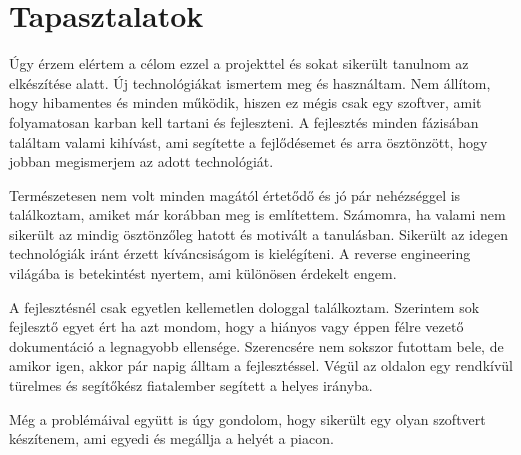 \documentclass{thesis-ekf}
\theoremstyle{definition}
\theoremstyle{remark}
\begin{document}
\chapter{Tapasztalatok}\label{tapasztalatok}

Úgy érzem elértem a célom ezzel a projekttel és sokat sikerült tanulnom az elkészítése alatt.
Új technológiákat ismertem meg és használtam. Nem állítom, hogy hibamentes és minden működik, hiszen ez mégis csak egy szoftver, amit folyamatosan karban kell tartani és fejleszteni.
A fejlesztés minden fázisában találtam valami kihívást, ami segítette a fejlődésemet és arra ösztönzött, hogy jobban megismerjem az adott technológiát.

Természetesen nem volt minden magától értetődő és jó pár nehézséggel is találkoztam, amiket már korábban meg is említettem.
Számomra, ha valami nem sikerült az mindig ösztönzőleg hatott és motivált a tanulásban. Sikerült az idegen technológiák iránt érzett kíváncsiságom is kielégíteni.
A reverse engineering világába is betekintést nyertem, ami különösen érdekelt engem. 

A fejlesztésnél csak egyetlen kellemetlen dologgal találkoztam. Szerintem sok fejlesztő egyet ért ha azt mondom, hogy a hiányos vagy éppen félre vezető dokumentáció a legnagyobb ellensége.
Szerencsére nem sokszor futottam bele, de amikor igen, akkor pár napig álltam a fejlesztéssel. Végül az oldalon egy rendkívül türelmes és segítőkész fiatalember segített a helyes irányba. 

Még a problémáival együtt is úgy gondolom, hogy sikerült egy olyan szoftvert készítenem, ami egyedi és megállja a helyét a piacon. 
\end{document}
